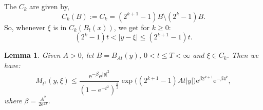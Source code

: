 \documentclass[a4paper,oneside,10pt]{amsproc}
\newtheorem{lemma}{Lemma}
\theoremstyle{remark}
\renewcommand{\leq}{\leqslant}
\renewcommand{\leq}{\leqslant}
\renewcommand{\geq}{\geqslant}
\newcommand{\e}{\mathrm{e}} %
\renewcommand{\leq}{\leqslant}%
\renewcommand{\geq}{\geqslant}%
\begin{document}
The $C_k$ are given by,
\begin{equation}
  \label{eq:C_k-annulus-decomposition}
  C_k(B) := C_k = (2^{k + 1} - 1)B \setminus (2^k - 1)B.
\end{equation}
So, whenever $\xi$ is in $C_k(B_t(x))$, we get for $k \geq 0$:
\begin{equation}
  \label{eq:C_k-annulus-decomposition-expand}
  (2^k - 1) t < |y - \xi| \leq (2^{k + 1} - 1) t.
\end{equation}

\begin{lemma}\label{lem:On-diagonal-kernel-estimates-on-Ck}
  Given $A > 0$, let $B = B_{At}(y)$, $0 < t \leq T < \infty$ and $\xi \in C_k$. Then we have:
  \begin{equation*}
    M_{t^2}(y, \xi) \leq \frac{\e^{-\beta} \e^{|y|^2}}{(1 - \e^{-t^2})^{\frac{d}2}}
    \exp\bigl((2^{k + 1} - 1) A t |y| \bigr) \e^{\beta 2^{k + 1}} \e^{-\beta 4^k},
  \end{equation*}
  where $\beta = \frac{A^2}{2 \e^{2T}}$.
\end{lemma}
\end{document}

